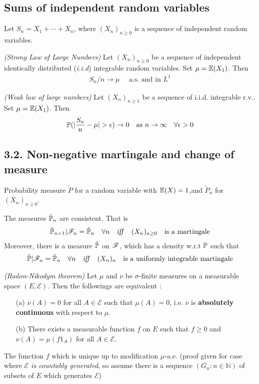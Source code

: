 \documentclass[10pt,a4paper]{report}
\begin{document}
\subsection*{Sums of independent random variables}

Let $S_n = X_1 + \cdots + X_n$, where $(X_n)_{n\geq 0}$ is a sequence of independent random variables.
\s

 \emph{(Strong Law of Large Numbers)} Let $(X_n)_{n\geq 0}$ be a sequence of independent identically distributed (\emph{i.i.d}) integrable random variables. Set $\mu = \mathbb{E}(X_{1})$. Then
\begin{align*}
S_n / n \rightarrow \mu \quad \text{ a.s. and in } L^1
\end{align*}
\s

 \emph{(Weak law of large numbers)} Let $(X_n)_{n\geq 1}$ be a sequence of i.i.d. integrable r.v.. Set $\mu =\mathbb{E}(X_1)$. Then 
\begin{align*}
\mathbb{P}(|\frac{S_n}{n} -\mu| > \epsilon) \rightarrow 0 \quad \text{as } n\rightarrow \infty \quad \forall \epsilon >0
\end{align*}
\s

\subsection*{3.2. Non-negative martingale and change of measure}

Probability measure $\tilde{P}$ for a random variable with $\mathbb{E}(X)=1$,and $\tilde{P}_n$ for $(X_n)_{n\geq 0}$.
\s

 The measures $\tilde{\mathbb{P}}_n$ are consistent. That is
\begin{align*}
\tilde{\mathbb{P}}_{n+1} | \mathscr{F}_n = \tilde{\mathbb{P}}_n \quad \forall n \quad \text{\emph{iff}} \quad (X_n)_{n\geq 0} \quad \text{is a martingale}
\end{align*}
Moreover, there is a measure $\tilde{\mathbb{P}}$ on $\mathscr{F}$, which has a density w.r.t $\mathbb{P}$ such that
\begin{align*}
\tilde{\mathbb{P}} |\mathscr{F}_n = \tilde{\mathbb{P}}_n \quad \forall n \quad \text{\emph{iff}} \quad (X_n)_n \quad \text{is a uniformly integrable martingale}
\end{align*}
\s

 \emph{(Radon-Nikodym theorem)} Let $\mu$ and $\nu$ be $\sigma$-finite measures on a measurable space $(E, \mathscr{E})$. Then the followings are equivalent :
\begin{itemize}
\item[(a)] $\nu(A) =0$ for all $A\in \mathscr{E}$ such that $\mu(A) =0$, i.e. $\nu$ is \textbf{absolutely continuous} with respect to $\mu$.
\item[(b)] There exists a measurable function $f$ on $E$ such that $f\geq 0$ and $\nu(A) = \mu(f 1_A)$ for all $A\in \mathscr{E}$.
\end{itemize}
The function $f$ which is unique up to modification $\mu$-a.e.
(proof given for case where \emph{$\mathscr{E}$ is countably generated}, so assume there is a sequence $(G_n : n \in \mathbb{N})$ of subsets of $E$ which generates $\mathscr{E}$)
\s
\end{document}
